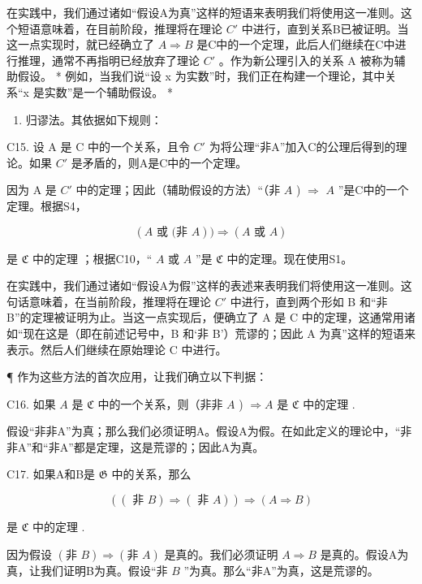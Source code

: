 在实践中，我们通过诸如“假设A为真”这样的短语来表明我们将使用这一准则。这个短语意味着，在目前阶段，推理将在理论 \(C'\) 中进行，直到关系B已被证明。当这一点实现时，就已经确立了 \(A \Longrightarrow B\) 是C中的一个定理，此后人们继续在C中进行推理，通常不再指明已经放弃了理论 \(C'\) 。作为新公理引入的关系 A 被称为辅助假设。 * 例如，当我们说“设 x 为实数”时，我们正在构建一个理论，其中关系“x 是实数”是一个辅助假设。 *

\begin{enumerate}
\def\labelenumi{\Roman{enumi}.}
\setcounter{enumi}{1}
\tightlist
\item
  归谬法。其依据如下规则：
\end{enumerate}

C15. 设 A 是 C 中的一个关系，且令 \(C'\) 为将公理“非A”加入C的公理后得到的理论。如果 \(C'\) 是矛盾的，则A是C中的一个定理。

因为 A 是 \(C'\) 中的定理；因此（辅助假设的方法）“（非 \(A\) ) \(\Longrightarrow\) \(A\) ”是C中的一个定理。根据S4，

\[
(A \text {   或   (非   } A)) \Longrightarrow (A \text {   或   } A)
\]

是 \(\mathfrak{C}\) 中的定理 ；根据C10，“ \(A\) 或 \(A\) ”是 \(\mathfrak{C}\) 中的定理。现在使用S1。

在实践中，我们通过诸如“假设A为假”这样的表述来表明我们将使用这一准则。这句话意味着，在当前阶段，推理将在理论 \(C'\) 中进行，直到两个形如 B 和“非 B”的定理被证明为止。当这一点实现后，便确立了 A 是 C 中的定理，这通常用诸如“现在这是（即在前述记号中，B 和‘非 B’）荒谬的；因此 A 为真”这样的短语来表示。然后人们继续在原始理论 C 中进行。

¶ 作为这些方法的首次应用，让我们确立以下判据：

C16. 如果 \(A\) 是 \(\mathfrak{C}\) 中的一个关系，则（非非 \(A\) ) \(\Longrightarrow A\) 是 \(\mathfrak{C}\) 中的定理 .

假设“非非A”为真；那么我们必须证明A。假设A为假。在如此定义的理论中，“非非A”和“非A”都是定理，这是荒谬的；因此A为真。

C17. 如果A和B是 \(\mathfrak{G}\) 中的关系，那么

\[
((\text { 非 } B) \Longrightarrow (\text { 非 } A)) \Longrightarrow (A \Longrightarrow B)
\]

是 \(\mathfrak{C}\) 中的定理 .

因为假设 \((\text{非 } B) \Longrightarrow (\text{非 } A)\) 是真的。我们必须证明 \(A \Longrightarrow B\) 是真的。假设A为真，让我们证明B为真。假设“非 \(B\) ”为真。那么“非A”为真，这是荒谬的。

